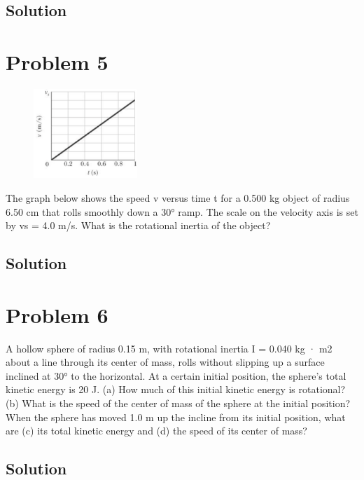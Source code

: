 \documentclass[12pt]{article}
\begin{document}
\subsection{Solution}


\pagebreak

\section{Problem 5}
\begin{figure}
    \vspace{-30pt}
    \includegraphics[width=0.35\textwidth]{graph_5.png} 
\end{figure}
The graph below shows the speed v versus time t for a 0.500 kg object of radius 6.50 cm that rolls smoothly down a 30\unit{\degree} ramp. The scale on the velocity axis is set by vs = 4.0 m/s. What is the rotational inertia of the object?

\subsection{Solution}


\pagebreak

\section{Problem 6}
A hollow sphere of radius 0.15 m, with rotational inertia I = 0.040 kg · m2 about a line through its center of mass, rolls without slipping up a surface inclined at 30° to the horizontal. At a certain initial position, the sphere's total kinetic energy is 20 J. (a) How much of this initial kinetic energy is rotational? (b) What is the speed of the center of mass of the sphere at the initial position? When the sphere has moved 1.0 m up the incline from its initial position, what are (c) its total kinetic energy and (d) the speed of its center of mass?

\subsection{Solution}
\end{document}
